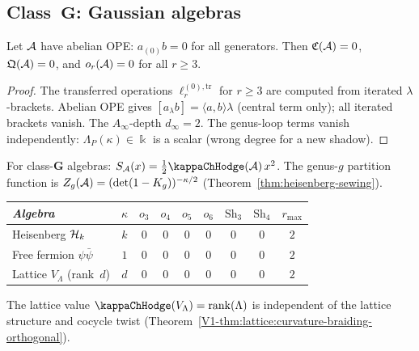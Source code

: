 
\subsection{Class~$\mathbf{G}$: Gaussian algebras}

\begin{theorem}
\ClaimStatusProvedHere
{}
Let $\mathcal{A}$ have abelian OPE: $a_{(0)}b = 0$ for all generators.
Then $\mathfrak{C}(\mathcal{A}) = 0$, $\mathfrak{Q}(\mathcal{A}) = 0$, and
$o_r(\mathcal{A}) = 0$ for all $r \geq 3$.
\end{theorem}

\begin{proof}
The transferred operations $\ell_r^{(0),\mathrm{tr}}$ for
$r \geq 3$ are computed from iterated $\lambda$-brackets.
Abelian OPE gives $[a_\lambda b] = \langle a,b\rangle\lambda$
(central term only); all iterated brackets vanish.
The $A_\infty$-depth $d_\infty = 2$.
The genus-loop terms vanish independently:
$\Lambda_P(\kappa) \in \Bbbk$ is a scalar (wrong
degree for a new shadow).
\end{proof}

\begin{corollary}
\ClaimStatusProvedHere
For class-$\mathbf{G}$ algebras:
$S_\cA(x) = \frac{1}{2}\kappaChHodge(\cA)\,x^2$.
The genus-$g$ partition function is
$Z_g(\mathcal{A}) = (\det(1 - K_g))^{-\kappa/2}$
\textup{(}Theorem~\ref{thm:heisenberg-sewing}\textup{)}.
\end{corollary}

\begin{example}
\begin{center}
\small
\renewcommand{\arraystretch}{1.15}
\begin{tabular}{lcccccccc}
\toprule
\emph{Algebra} & $\kappa$ & $o_3$ & $o_4$ & $o_5$ &
 $o_6$ & $\mathrm{Sh}_3$ & $\mathrm{Sh}_4$ & $r_{\max}$ \\
\midrule
Heisenberg $\mathcal{H}_k$ & $k$ & $0$ & $0$ & $0$ & $0$ &
 $0$ & $0$ & $2$ \\
Free fermion $\psi\bar\psi$ & $1$ & $0$ & $0$ & $0$ & $0$ &
 $0$ & $0$ & $2$ \\
Lattice $V_\Lambda$ (rank~$d$) & $d$ & $0$ & $0$ & $0$ & $0$ &
 $0$ & $0$ & $2$ \\
\bottomrule
\end{tabular}
\end{center}
The lattice value $\kappaChHodge(V_\Lambda) = \mathrm{rank}(\Lambda)$
is independent of the lattice structure and cocycle twist
(Theorem~\ref{V1-thm:lattice:curvature-braiding-orthogonal}).
\end{example}



